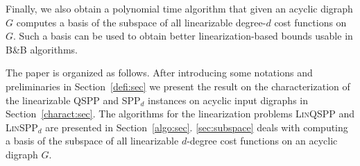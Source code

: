Finally, we also obtain a polynomial time algorithm that given an acyclic digraph $G$ computes a basis of the subspace of all linearizable degree-$d$ cost functions on $G$. Such a basis can be used to obtain better linearization-based bounds usable in B\&B algorithms.
\smallskip

The paper is organized as follows. 
After introducing some notations and preliminaries in Section~\ref{defi:sec} we present the result on the characterization of the linearizable QSPP and SPP$_d$ instances on acyclic input digraphs in Section~\ref{charact:sec}. The algorithms for the linearization problems \textsc{Lin}QSPP and \textsc{Lin}SPP$_d$ are presented in Section~\ref{algo:sec}. 
\cref{sec:subspace} deals with 
computing a basis of the subspace of all linearizable $d$-degree cost functions on an acyclic digraph $G$.

